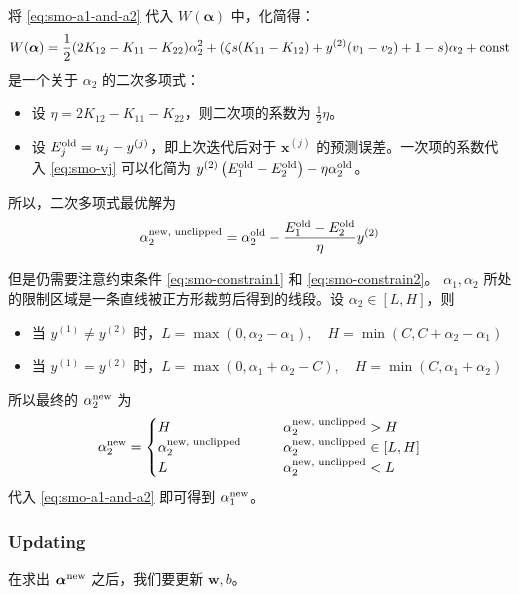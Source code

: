 		将 \eqref{eq:smo-a1-and-a2} 代入 $ W(\bm{\alpha}) $ 中，化简得：
		\begin{equation}
			W(\bm{\alpha}) = \frac{1}{2} (2K_{12} - K_{11} - K_{22}) \alpha_2^2 \\
			+ (\zeta s (K_{11} - K_{12}) + y^{(2)} (v_1 - v_2) + 1-s) \alpha_2 + \text{const}
		\end{equation}
		是一个关于 $ \alpha_2 $ 的二次多项式：
		\begin{itemize}
			\item 设 $ \eta = 2K_{12} - K_{11} - K_{22} $，则二次项的系数为 $ \frac{1}{2} \eta $。 
			\item 设 $ E_j^{\text{old}} = u_j - y^{(j)} $，即上次迭代后对于 $ \bm{x}^{(j)} $ 的预测误差。一次项的系数代入 \eqref{eq:smo-vj} 可以化简为 $ y^{(2)} \left( E_1^{\text{old}} - E_2^{\text{old}} \right) - \eta \alpha_2^{\text{old}} $。
		\end{itemize}
		
		所以，二次多项式最优解为
		\begin{equation}
			\alpha_2^\text{new, unclipped} = \alpha_2^{\text{old}} - \frac{ E_1^{\text{old}} - E_2^{\text{old}} }{\eta} y^{(2)}
		\end{equation}
		
		但是仍需要注意约束条件 \eqref{eq:smo-constrain1} 和 \eqref{eq:smo-constrain2}。 
		$ \alpha_1, \alpha_2 $ 所处的限制区域是一条直线被正方形裁剪后得到的线段。设 $ \alpha_2 \in [L, H]$，则
		\begin{itemize}
			\item 当 $ y^{(1)} \neq y^{(2)} $ 时，$ L = \max(0, \alpha_2 - \alpha_1), \quad H = \min(C, C + \alpha_2 - \alpha_1) $ 
			\item 当 $ y^{(1)} = y^{(2)} $ 时，$ L = \max(0, \alpha_1 + \alpha_2 - C), \quad H = \min(C, \alpha_1 + \alpha_2) $
		\end{itemize}
		
		所以最终的 $ \alpha_2^{\text{new}} $ 为
		\begin{equation*}
			\alpha_2^{\text{new}} = 
			\begin{cases}
				H &\qquad \alpha_2^\text{new, unclipped} > H \\
				\alpha_2^\text{new, unclipped} &\qquad \alpha_2^\text{new, unclipped} \in [L, H] \\
				L &\qquad \alpha_2^\text{new, unclipped} < L
			\end{cases}
		\end{equation*}
		代入 \eqref{eq:smo-a1-and-a2} 即可得到 $ \alpha_1^{\text{new}} $。
		
	\subsubsection{Updating} 
		在求出 $ \bm{\alpha}^{\text{new}} $ 之后，我们要更新 $ \bm{w}, b $。
		
